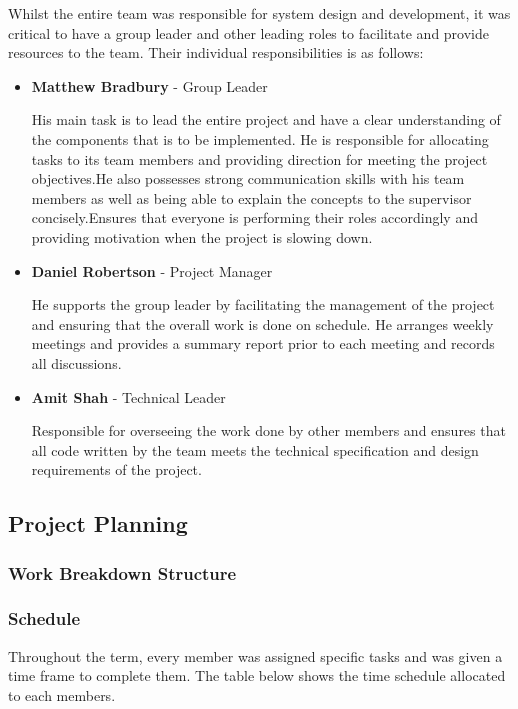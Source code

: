 Whilst the entire team was responsible for system design and development, it was critical to have a group leader and other leading roles to facilitate and provide resources to the team. Their individual responsibilities is as follows:

\begin{itemize}
	\item[] {\bf Matthew Bradbury} - Group Leader
	
	His main task is to lead the entire project and have a clear understanding of the components that is to be implemented. He is responsible for allocating tasks to its team members and providing direction for meeting the project objectives.He also possesses strong communication skills with his team members as well as being able to explain the concepts to the supervisor concisely.Ensures that everyone is performing their roles accordingly and providing motivation when the project is slowing down.	

	\item[] {\bf Daniel Robertson} - Project Manager
	
	He supports the group leader by facilitating the management of the project and ensuring that the overall work is done on schedule. He arranges weekly meetings and provides a summary report prior to each meeting and records all discussions.
	
	\item[] {\bf Amit Shah} - Technical Leader
	
	Responsible for overseeing the work done by other members and ensures that all code written by the team meets the technical specification and design requirements of the project.	
	
\end{itemize}

\subsection{Project Planning}

\subsubsection{Work Breakdown Structure}

\subsubsection{Schedule}

Throughout the term, every member was assigned specific tasks and was given a time frame to complete them. The table below shows the time schedule allocated to each members.

